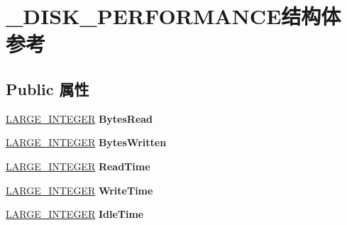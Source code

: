 \hypertarget{struct___d_i_s_k___p_e_r_f_o_r_m_a_n_c_e}{}\section{\+\_\+\+D\+I\+S\+K\+\_\+\+P\+E\+R\+F\+O\+R\+M\+A\+N\+C\+E结构体 参考}
\label{struct___d_i_s_k___p_e_r_f_o_r_m_a_n_c_e}
\subsection*{Public 属性}
\begin{DoxyCompactItemize}
\item 
\mbox{\label{struct___d_i_s_k___p_e_r_f_o_r_m_a_n_c_e_ad44b66de80e468de73f2e0ff12014ebe}} 
\hyperlink{union___l_a_r_g_e___i_n_t_e_g_e_r}{L\+A\+R\+G\+E\+\_\+\+I\+N\+T\+E\+G\+ER} {\bfseries Bytes\+Read}
\item 
\mbox{\label{struct___d_i_s_k___p_e_r_f_o_r_m_a_n_c_e_a1916f646e338b246cacc94b9a7c7c58e}} 
\hyperlink{union___l_a_r_g_e___i_n_t_e_g_e_r}{L\+A\+R\+G\+E\+\_\+\+I\+N\+T\+E\+G\+ER} {\bfseries Bytes\+Written}
\item 
\mbox{\label{struct___d_i_s_k___p_e_r_f_o_r_m_a_n_c_e_a0126fb5ffb901ef6c4ef2f6436aa8cde}} 
\hyperlink{union___l_a_r_g_e___i_n_t_e_g_e_r}{L\+A\+R\+G\+E\+\_\+\+I\+N\+T\+E\+G\+ER} {\bfseries Read\+Time}
\item 
\mbox{\label{struct___d_i_s_k___p_e_r_f_o_r_m_a_n_c_e_a4cf572fe3f8b57ea38d8e5efe525dc90}} 
\hyperlink{union___l_a_r_g_e___i_n_t_e_g_e_r}{L\+A\+R\+G\+E\+\_\+\+I\+N\+T\+E\+G\+ER} {\bfseries Write\+Time}
\item 
\mbox{\label{struct___d_i_s_k___p_e_r_f_o_r_m_a_n_c_e_aa0fb5ccb75073e502a8926f6e96bafa9}} 
\hyperlink{union___l_a_r_g_e___i_n_t_e_g_e_r}{L\+A\+R\+G\+E\+\_\+\+I\+N\+T\+E\+G\+ER} {\bfseries Idle\+Time}
\item 
\mbox{\label{struct___d_i_s_k___p_e_r_f_o_r_m_a_n_c_e_afebdc8a333e214aa7d36e67886403a39}} 

\end{DoxyCompactItemize}
